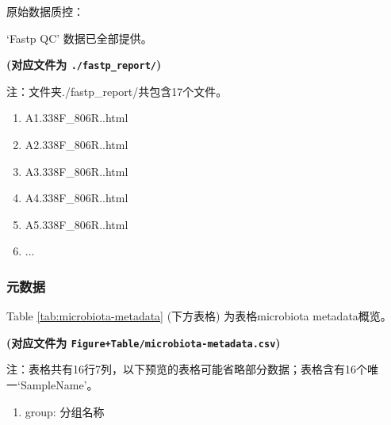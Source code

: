 \documentclass[
]{article}
\providecommand{\tightlist}{%
  \setlength{\itemsep}{0pt}\setlength{\parskip}{0pt}}
\begin{document}
原始数据质控：

`Fastp QC' 数据已全部提供。

\textbf{(对应文件为 \texttt{./fastp\_report/})}

\begin{center}\begin{tcolorbox}[colback=gray!10, colframe=gray!50, width=0.9\linewidth, arc=1mm, boxrule=0.5pt]注：文件夹./fastp\_report/共包含17个文件。

\begin{enumerate}\tightlist
\item A1.338F\_806R..html
\item A2.338F\_806R..html
\item A3.338F\_806R..html
\item A4.338F\_806R..html
\item A5.338F\_806R..html
\item ...
\end{enumerate}\end{tcolorbox}
\end{center}

\hypertarget{ux5143ux6570ux636e}{%
\subsubsection{元数据}\label{ux5143ux6570ux636e}}

Table \ref{tab:microbiota-metadata} (下方表格) 为表格microbiota metadata概览。

\textbf{(对应文件为 \texttt{Figure+Table/microbiota-metadata.csv})}

\begin{center}\begin{tcolorbox}[colback=gray!10, colframe=gray!50, width=0.9\linewidth, arc=1mm, boxrule=0.5pt]注：表格共有16行7列，以下预览的表格可能省略部分数据；表格含有16个唯一`SampleName'。
\end{tcolorbox}
\end{center}
\begin{center}\begin{tcolorbox}[colback=gray!10, colframe=gray!50, width=0.9\linewidth, arc=1mm, boxrule=0.5pt]\begin{enumerate}\tightlist
\item group:  分组名称
\end{enumerate}\end{tcolorbox}
\end{center}
\end{document}
